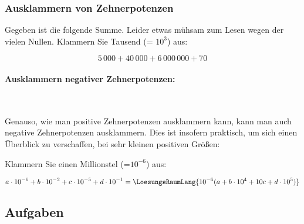 \subsubsection{Ausklammern von Zehnerpotenzen}
Gegeben ist die folgende Summe. Leider etwas mühsam zum Lesen wegen der vielen Nullen. Klammern Sie Tausend (= $10^3$) aus:

$$5\,000 + 40\,000 + 6\,000\,000 + 70$$


\paragraph{Ausklammern negativer Zehnerpotenzen:}
\,

\vspace{1mm}

Genauso, wie man positive Zehnerpotenzen ausklammern kann, kann man auch negative Zehnerpotenzen ausklammern. Dies ist insofern praktisch, um sich einen Überblick zu verschaffen, bei sehr kleinen positiven Größen:

Klammern Sie einen Millionstel (=$10^{-6}$) aus:


$$a\cdot{}10^{-6} + b\cdot{}10^{-2} + c\cdot{}10^{-5} + d\cdot{}10^{-1} = \LoesungsRaumLang{10^{-6} (a + b\cdot{}10^4 + 10c + d\cdot{}10^{5})}$$

\subsection*{Aufgaben}


\newpage
